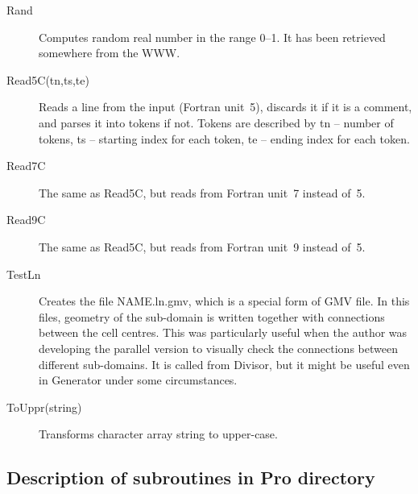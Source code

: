 \documentclass[10pt]{article}
\newcommand*{\tc}{\ttfamily} %
\newcommand*{\tn}{\sffamily} %
\begin{document}
\begin{description}
    \item[\tc Rand] Computes random real number in the range \mbox{0--1}.
      It has been retrieved somewhere from the WWW.

    \item[\tc Read5C(tn,ts,te)] Reads a line from the input
      (Fortran unit~5), discards it if it is a comment, and
      parses it into tokens if not. Tokens are described by
      {\tc tn} -- number of tokens, {\tc ts} -- starting 
      index for each token, {\tc te} -- ending index for each
      token.

    \item[\tc Read7C] The same as {\tc Read5C}, but reads
      from Fortran unit~7 instead of~5.

    \item[\tc Read9C] The same as {\tc Read5C}, but reads
      from Fortran unit~9 instead of~5.

    \item[\tc TestLn] Creates the file NAME.ln.gmv, which is 
      a special form of GMV file. In this files, geometry of
      the sub-domain is written together with connections 
      between the cell centres. This was particularly useful
      when the author was developing the parallel version to
      visually check the connections between different sub-domains.
      It is called from {\tn Divisor}, but it might be useful
      even in {\tn Generator} under some circumstances.

    \item[\tc ToUppr(string)] Transforms character array
      {\tc string} to upper-case.

    \end{description}


    \subsection{Description of subroutines in {\tc Pro} directory}
\end{document}
